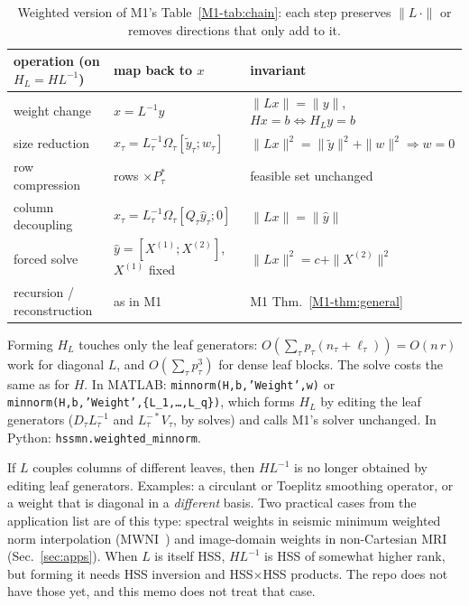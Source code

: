 \begin{table}[h]
\centering\small
\begin{tabular}{@{}lll@{}}
\toprule
operation (on $H_L=HL^{-1}$) & map back to $x$ & invariant\\
\midrule
weight change & $x=L^{-1}y$ & $\|Lx\|=\|y\|$, \ $Hx=b\iff H_Ly=b$\\
size reduction & $x_\tau=L_\tau^{-1}\Omega_\tau[\tilde y_\tau;w_\tau]$ & $\|Lx\|^2=\|\tilde y\|^2+\|w\|^2\Rightarrow w=0$\\
row compression & rows $\times P_\tau^*$ & feasible set unchanged\\
column decoupling & $x_\tau=L_\tau^{-1}\Omega_\tau[Q_\tau\hat y_\tau;0]$ & $\|Lx\|=\|\hat y\|$\\
forced solve & $\hat y=[X^{(1)};X^{(2)}]$, $X^{(1)}$ fixed & $\|Lx\|^2=c+\|X^{(2)}\|^2$\\
recursion / reconstruction & as in M1 & M1 Thm.~\ref{M1-thm:general}\\
\bottomrule
\end{tabular}
\caption{Weighted version of M1's Table~\ref{M1-tab:chain}: each step preserves $\|L\,\cdot\|$ or removes
directions that only add to it.}
\label{tab:Wchain}
\end{table}

\begin{remark}
Forming $H_L$ touches only the leaf generators: $O(\sum_\tau p_\tau(n_\tau+\ell_\tau))=O(n\,r)$ work
for diagonal $L$, and $O(\sum_\tau p_\tau^3)$ for dense leaf blocks. The solve costs the same as for
$H$. In MATLAB: \texttt{minnorm(H,b,'Weight',w)} or \texttt{minnorm(H,b,'Weight',\{L\_1,\dots,L\_q\})},
which forms $H_L$ by editing the leaf generators ($D_\tau L_\tau^{-1}$ and $L_\tau^{-*}V_\tau$, by solves) and calls
M1's solver unchanged. In Python: \texttt{hssmn.weighted\_minnorm}.
\end{remark}

\begin{remark}\label{rem:nonconform}
If $L$ couples columns of different leaves, then $HL^{-1}$ is no longer obtained by editing leaf
generators. Examples: a circulant or Toeplitz smoothing operator, or a weight that is diagonal
in a \emph{different} basis. Two practical cases from the application list are of this type:
spectral weights in seismic minimum weighted norm interpolation (MWNI~\cite{mwni}) and image-domain weights
in non-Cartesian MRI (Sec.~\ref{sec:apps}). When $L$ is itself HSS, $HL^{-1}$ is HSS of somewhat
higher rank, but forming it needs HSS inversion and HSS$\times$HSS products. The repo does not
have those yet, and this memo does not treat that case.
\end{remark}

